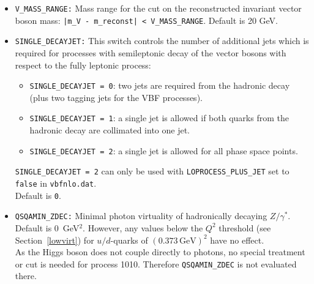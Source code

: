 \documentclass[english,12pt]{article}
\begin{document}
\begin{itemize}
      the hadronically decaying vector boson. All possible jet combinations are taken into account, the one
      which gives an invariant mass closest to the vector boson mass is used to apply the cut.
\begin{itemize}
 \item {\tt RECONST\_HAD\_V = 0}: No cut on the reconstructed invariant vector boson mass.
 \item {\tt RECONST\_HAD\_V = 1}: Use two-jet invariant mass, tagging jets are not considered.
 \item {\tt RECONST\_HAD\_V = 2}: Use invariant mass of a single jet, tagging jets are not considered (``subjet-analysis'',
       only needed when {\tt SINGLE\_DECAYJET > 0}).
 \item {\tt RECONST\_HAD\_V = 3}: Use one- or two-jet invariant mass, tagging jets are not considered.
\end{itemize}
       Default is 0.
\item {\tt V\_MASS\_RANGE:} Mass range for the cut on the reconstructed invariant vector boson mass:
      {\tt |m\_V - m\_reconst| < V\_MASS\_RANGE}. Default is 20 GeV.
\item {\tt SINGLE\_DECAYJET:} This switch controls the number of additional jets which is required
      for processes with semileptonic decay of the vector bosons with respect to the fully leptonic process:
\begin{itemize}
 \item {\tt SINGLE\_DECAYJET = 0}: two jets are required from the hadronic decay (plus two tagging jets
       for the VBF processes).
 \item {\tt SINGLE\_DECAYJET = 1}: a single jet is allowed if both quarks from the hadronic decay are collimated into one jet.
 \item {\tt SINGLE\_DECAYJET = 2}: a single jet is allowed for all phase space points.
\end{itemize}
      {\tt SINGLE\_DECAYJET = 2} can only be used with {\tt LOPROCESS\_PLUS\_JET} 
      set to {\tt false} in {\tt vbfnlo.dat}.\\
      Default is {\tt 0}.
\item {\tt QSQAMIN\_ZDEC:} Minimal photon virtuality of hadronically decaying $Z/\gamma^*$. \\
      Default is 0~GeV$^2$. However, any values below the $Q^2$ threshold (see Section~\ref{lowvirt}) 
      for $u/d$-quarks of $(0.373\,\text{GeV})^2$ have no effect.\\
      As the Higgs boson does not couple directly to photons, no special treatment or cut is needed for
      process 1010. Therefore {\tt QSQAMIN\_ZDEC} is not evaluated there.\\
\end{itemize}
\end{document}
